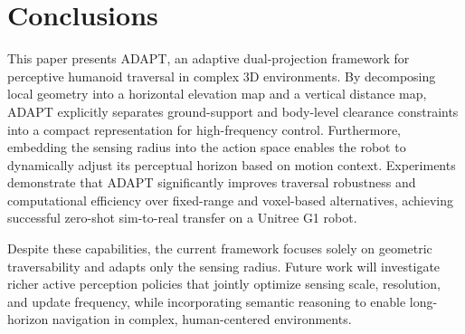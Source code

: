 \documentclass[letterpaper, 10 pt, conference]{ieeeconf/ieeeconf}
\begin{document}
\section{Conclusions}
This paper presents ADAPT, an adaptive dual-projection framework for perceptive humanoid traversal in complex 3D environments. By decomposing local geometry into a horizontal elevation map and a vertical distance map, ADAPT explicitly separates ground-support and body-level clearance constraints into a compact representation for high-frequency control. Furthermore, embedding the sensing radius into the action space enables the robot to dynamically adjust its perceptual horizon based on motion context. Experiments demonstrate that ADAPT significantly improves traversal robustness and computational efficiency over fixed-range and voxel-based alternatives, achieving successful zero-shot sim-to-real transfer on a Unitree G1 robot.

Despite these capabilities, the current framework focuses solely on geometric traversability and adapts only the sensing radius. Future work will investigate richer active perception policies that jointly optimize sensing scale, resolution, and update frequency, while incorporating semantic reasoning to enable long-horizon navigation in complex, human-centered environments.

\balance
\end{document}
